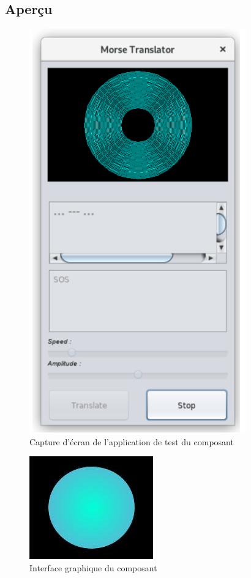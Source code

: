 \documentclass[a4paper,11pt]{article}
\begin{document}
    \subsection{Aperçu}
    \begin{figure}[H]
        \begin{center}
            \includegraphics[scale=0.7]{descpicture.png}
            \caption{Capture d'écran de l'application de test du composant}
            \label{Capture d'écran de l'application de test du composant}
        \end{center}
    \end{figure}

    \begin{figure}[H]
        \begin{center}
            \includegraphics[scale=1]{comdescpicture.jpg}
            \caption{Interface graphique du composant}
            \label{Interface graphique du composant}
        \end{center}
    \end{figure}
\end{document}
